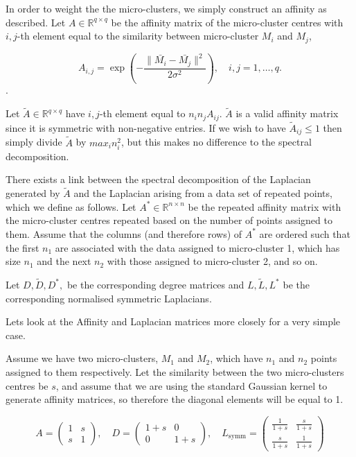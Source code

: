 In order to weight the the micro-clusters, we simply construct an affinity as described. 
Let $A \in \mathbb{R}^{q \times q}$ be the affinity matrix of the micro-cluster centres with $i,j$-th element equal to the similarity between micro-cluster $M_i$ and $M_j$, 

\[ A_{i,j} = \exp \left(- \frac{\| \bar{M_i} - \bar{M_j}\|^2}{2 \sigma^2} \right), \quad i, j = 1, \ldots, q. \].

Let $\tilde{A} \in \mathbb{R}^{q \times q}$ have $i,j$-th element equal to $n_in_jA_{ij}$. $\tilde{A}$ is a valid affinity matrix since it is symmetric with non-negative entries. If we wish to have $\tilde{A}_{ij} \leq 1$ then simply divide $\tilde{A}$ by $max_i n_i^2$, but this makes no difference to the spectral decomposition. 

There exists a link between the spectral decomposition of  the Laplacian generated by $\tilde{A}$ and the Laplacian arising from a data set of repeated points, which we define as follows.  Let $A^* \in \mathbb{R}^{n \times n}$ be the repeated affinity matrix with the micro-cluster centres repeated based on the number of points assigned to them. Assume that the columns (and therefore rows) of $A^*$ are ordered such that the first $n_1$ are associated with the data assigned to micro-cluster 1, which has size $n_1$ and the next $n_2$ with those assigned to micro-cluster 2, and so on.

Let $D, \tilde{D}, D^{*},$ be the corresponding degree matrices and $L, \tilde{L}, L^{*}$ be the corresponding normalised symmetric Laplacians.

Lets look at the Affinity and Laplacian matrices more closely for a very simple case. 

Assume we have two micro-clusters, $M_1$ and $M_2$,  which have $n_1$ and $n_2$ points assigned to them respectively. Let the similarity between the two micro-clusters centres be $s$, and assume that we are using the standard Gaussian kernel to generate affinity matrices, so therefore the diagonal elements will be equal to 1. 

\[ A = \left(
  \begin{array}{cc}
    1 & s \\
    s & 1
  \end{array} \right), \quad
%
 D = \left(
  \begin{array}{cc}
    1+s & 0 \\
    0 & 1+s
  \end{array} \right), \quad
%
 L_{\text{symm}} = \left(
  \begin{array}{cc}
    \frac{1}{1+s} & \frac{s}{1+s} \\
    \frac{s}{1+s} & \frac{1}{1+s} 
  \end{array} \right) \]

